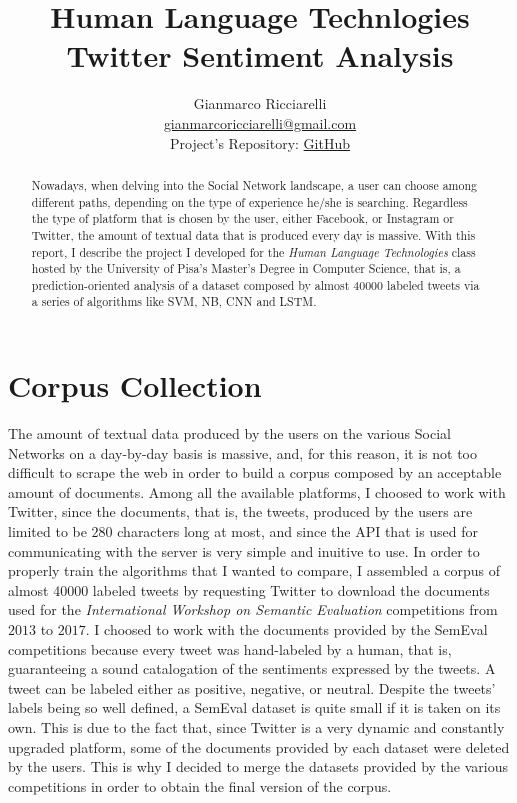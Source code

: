 \documentclass[11pt,twocolumn]{article}
\title{\textbf{Human Language Technlogies \\ Twitter Sentiment Analysis}}
\author{Gianmarco Ricciarelli \\ \href{mailto:gianmarcoricciarelli@gmail.com}{gianmarcoricciarelli@gmail.com}\\
Project's Repository: \href{https://github.com/germz01/twitter_sentiment_analysis}{GitHub}}
\date{}
\begin{document}
    \maketitle

    \begin{abstract}
        \noindent
        Nowadays, when delving into the Social Network landscape, a user can choose among different
        paths, depending on the type of experience he/she is searching. Regardless the type of platform that
        is chosen by the user, either Facebook, or Instagram or Twitter, the amount of textual data that is
        produced every day is massive. With this report, I describe the project I developed for the
        \textit{Human Language Technologies} class hosted by the University of Pisa's Master's Degree in
        Computer Science, that is, a prediction-oriented analysis of a dataset composed by almost $40000$
        labeled tweets via a series of algorithms like SVM, NB, CNN and LSTM.
    \end{abstract}

    \section{Corpus Collection} %
    \label{sec:corpus_collection}
        The amount of textual data produced by the users on the various Social Networks on a day-by-day
        basis is massive, and, for this reason, it is not too difficult to scrape the web in order to
        build a corpus composed by an acceptable amount of documents. Among all the available platforms, I
        choosed to work with Twitter, since the documents, that is, the tweets, produced by the users are
        limited to be $280$ characters long at most, and since the API that is used for communicating with
        the server is very simple and inuitive to use. In order to properly train the algorithms that I
        wanted to compare, I assembled a corpus of almost $40000$ labeled tweets by requesting Twitter to
        download the documents used for the \textit{International Workshop on Semantic Evaluation}
        competitions from $2013$ to $2017$. I choosed to work with the documents provided by the SemEval
        competitions because every tweet was hand-labeled by a human, that is, guaranteeing a sound
        catalogation of the sentiments expressed by the tweets. A tweet can be labeled either as
        positive, negative, or neutral. Despite the tweets' labels being so well defined, a SemEval
        dataset is quite small if it is taken on its own. This is due to the fact that, since Twitter is a
        very dynamic and constantly upgraded platform, some of the documents provided by each dataset
        were deleted by the users. This is why I decided to merge the datasets provided by the various
        competitions in order to obtain the final version of the corpus.
\end{document}
